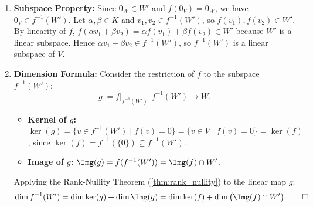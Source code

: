 \begin{exercisesolution}
\label{sol:preimage_subspace_dimension_formula}
\begin{enumerate}[label=\textbf{(\alph*)}]
    \item \textbf{Subspace Property:}
    Since $0_W \in W'$ and $f(0_V) = 0_W$, we have $0_V \in f^{-1}(W')$.
    Let $\alpha, \beta \in K$ and $v_1, v_2 \in f^{-1}(W')$, so $f(v_1), f(v_2) \in W'$.
    By linearity of $f$, $f(\alpha v_1 + \beta v_2) = \alpha f(v_1) + \beta f(v_2) \in W'$ because $W'$ is a linear subspace.
    Hence $\alpha v_1 + \beta v_2 \in f^{-1}(W')$, so $f^{-1}(W')$ is a linear subspace of $V$.

    \item \textbf{Dimension Formula:}
    Consider the restriction of $f$ to the subspace $f^{-1}(W')$:
    \[
    g := f|_{f^{-1}(W')} \colon f^{-1}(W') \to W.
    \]
    \begin{itemize}
        \item \textbf{Kernel of $g$:} $\ker(g) = \{v \in f^{-1}(W') \mid f(v) = 0\} = \{v \in V \mid f(v) = 0\} = \ker(f)$, since $\ker(f) = f^{-1}(\{0\}) \subseteq f^{-1}(W')$.
        \item \textbf{Image of $g$:} $\Img(g) = f(f^{-1}(W')) = \Img(f) \cap W'$.
    \end{itemize}
    Applying the Rank-Nullity Theorem (\cref{thm:rank_nullity}) to the linear map $g$:
    \[
    \dim f^{-1}(W') = \dim \ker(g) + \dim \Img(g) = \dim \ker(f) + \dim\big(\Img(f) \cap W'\big). \qedhere
    \]
\end{enumerate}
\end{exercisesolution}

